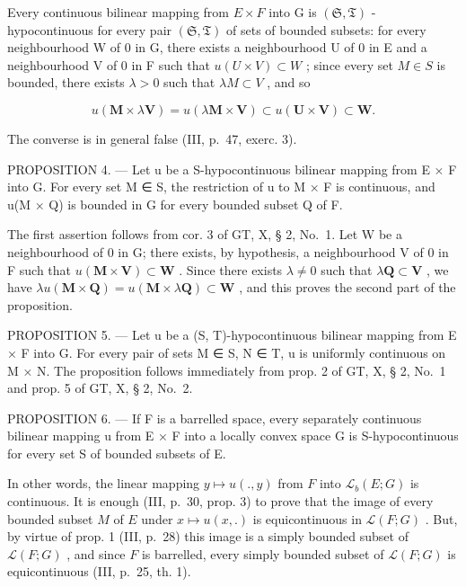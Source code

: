 Every continuous bilinear mapping from \(E \times F\) into G is \((\mathfrak{S}, \mathfrak{T})\) -hypocontinuous for every pair \((\mathfrak{S}, \mathfrak{T})\) of sets of bounded subsets: for every neighbourhood W of 0 in G, there exists a neighbourhood U of 0 in E and a neighbourhood V of 0 in F such that \(u(U \times V) \subset W\) ; since every set \(M \in S\) is bounded, there exists \(\lambda > 0\) such that \(\lambda M \subset V\) , and so

\[
u (\mathbf {M} \times \lambda \mathbf {V}) = u (\lambda \mathbf {M} \times \mathbf {V}) \subset u (\mathbf {U} \times \mathbf {V}) \subset \mathbf {W}.
\]

The converse is in general false (III, p.~47, exerc. 3).

PROPOSITION 4. --- Let u be a S-hypocontinuous bilinear mapping from E × F into G. For every set M ∈ S, the restriction of u to M × F is continuous, and u(M × Q) is bounded in G for every bounded subset Q of F.

The first assertion follows from cor. 3 of GT, X, § 2, No.~1. Let W be a neighbourhood of 0 in G; there exists, by hypothesis, a neighbourhood V of 0 in F such that \(u(\mathbf{M} \times \mathbf{V}) \subset \mathbf{W}\) . Since there exists \(\lambda \neq 0\) such that \(\lambda \mathbf{Q} \subset \mathbf{V}\) , we have \(\lambda u(\mathbf{M} \times \mathbf{Q}) = u(\mathbf{M} \times \lambda \mathbf{Q}) \subset \mathbf{W}\) , and this proves the second part of the proposition.

PROPOSITION 5. --- Let u be a (S, T)-hypocontinuous bilinear mapping from E × F into G. For every pair of sets M ∈ S, N ∈ T, u is uniformly continuous on M × N. The proposition follows immediately from prop. 2 of GT, X, § 2, No.~1 and prop. 5 of GT, X, § 2, No.~2.

PROPOSITION 6. --- If F is a barrelled space, every separately continuous bilinear mapping u from E × F into a locally convex space G is S-hypocontinuous for every set S of bounded subsets of E.

In other words, the linear mapping \(y \mapsto u(., y)\) from \(F\) into \(\mathcal{L}_b(E; G)\) is continuous. It is enough (III, p.~30, prop. 3) to prove that the image of every bounded subset \(M\) of \(E\) under \(x \mapsto u(x, .)\) is equicontinuous in \(\mathcal{L}(F; G)\) . But, by virtue of prop. 1 (III, p.~28) this image is a simply bounded subset of \(\mathcal{L}(F; G)\) , and since \(F\) is barrelled, every simply bounded subset of \(\mathcal{L}(F; G)\) is equicontinuous (III, p.~25, th. 1).

